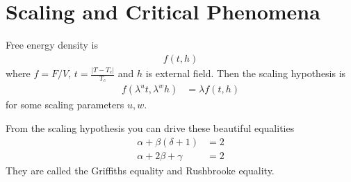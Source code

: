 \section{Scaling and Critical Phenomena}
Free energy density is
\begin{align}
    f\left( t, h \right)
\end{align}
where $f=F/V$, $t=\frac{|T - T_c|}{T_c}$ and $h$ is external field.
Then the scaling hypothesis is
\begin{align}
    f\left( \lambda^{u} t, \lambda^{w} h \right)
    &=
    \lambda f\left( t, h \right)
\end{align}
for some scaling parameters $u,w$.

From the scaling hypothesis you can drive these beautiful equalities
\begin{align}
    \alpha + \beta\left( \delta + 1 \right) &= 2\\
    \alpha + 2\beta + \gamma &= 2
\end{align}
They are called the Griffiths equality and Rushbrooke equality.
